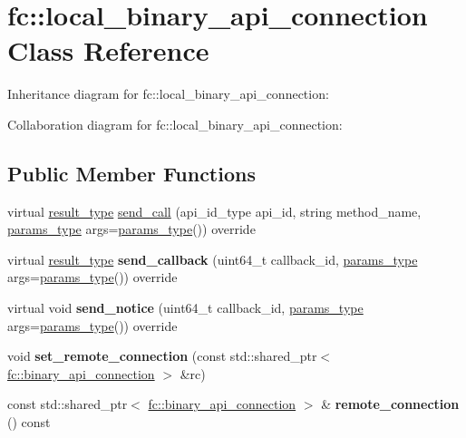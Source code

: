 \hypertarget{classfc_1_1local__binary__api__connection}{}\section{fc\+:\+:local\+\_\+binary\+\_\+api\+\_\+connection Class Reference}
\label{classfc_1_1local__binary__api__connection}


Inheritance diagram for fc\+:\+:local\+\_\+binary\+\_\+api\+\_\+connection\+:


Collaboration diagram for fc\+:\+:local\+\_\+binary\+\_\+api\+\_\+connection\+:
\subsection*{Public Member Functions}
\begin{DoxyCompactItemize}
\item 
virtual \mbox{\hyperlink{classstd_1_1vector}{result\+\_\+type}} \mbox{\hyperlink{classfc_1_1local__binary__api__connection_afe5ad41916d1118fcb24f14146df9485}{send\+\_\+call}} (api\+\_\+id\+\_\+type api\+\_\+id, string method\+\_\+name, \mbox{\hyperlink{classstd_1_1vector}{params\+\_\+type}} args=\mbox{\hyperlink{classstd_1_1vector}{params\+\_\+type}}()) override
\item 
\mbox{\label{classfc_1_1local__binary__api__connection_aef645f9dd44d9648f67090b2d549f5fc}} 
virtual \mbox{\hyperlink{classstd_1_1vector}{result\+\_\+type}} {\bfseries send\+\_\+callback} (uint64\+\_\+t callback\+\_\+id, \mbox{\hyperlink{classstd_1_1vector}{params\+\_\+type}} args=\mbox{\hyperlink{classstd_1_1vector}{params\+\_\+type}}()) override
\item 
\mbox{\label{classfc_1_1local__binary__api__connection_a81c808fde3e8ae654495887311ff98a2}} 
virtual void {\bfseries send\+\_\+notice} (uint64\+\_\+t callback\+\_\+id, \mbox{\hyperlink{classstd_1_1vector}{params\+\_\+type}} args=\mbox{\hyperlink{classstd_1_1vector}{params\+\_\+type}}()) override
\item 
\mbox{\label{classfc_1_1local__binary__api__connection_afee98c55356ce329e5274dc044d7c6ca}} 
void {\bfseries set\+\_\+remote\+\_\+connection} (const std\+::shared\+\_\+ptr$<$ \mbox{\hyperlink{classfc_1_1binary__api__connection}{fc\+::binary\+\_\+api\+\_\+connection}} $>$ \&rc)
\item 
\mbox{\label{classfc_1_1local__binary__api__connection_a971518cf86d8b7aa26c2ede5866875e9}} 
const std\+::shared\+\_\+ptr$<$ \mbox{\hyperlink{classfc_1_1binary__api__connection}{fc\+::binary\+\_\+api\+\_\+connection}} $>$ \& {\bfseries remote\+\_\+connection} () const
\end{DoxyCompactItemize}
